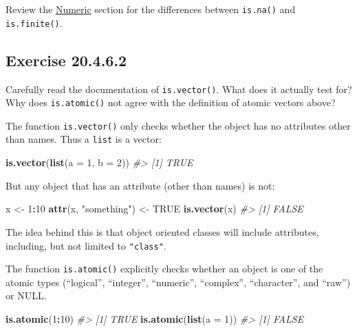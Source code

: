 \documentclass[]{book}
\newenvironment{Shaded}{\begin{snugshade}}{\end{snugshade}}
\newcommand{\CommentTok}[1]{\textcolor[rgb]{0.56,0.35,0.01}{\textit{#1}}}
\newcommand{\DataTypeTok}[1]{\textcolor[rgb]{0.13,0.29,0.53}{#1}}
\newcommand{\DecValTok}[1]{\textcolor[rgb]{0.00,0.00,0.81}{#1}}
\newcommand{\KeywordTok}[1]{\textcolor[rgb]{0.13,0.29,0.53}{\textbf{#1}}}
\newcommand{\NormalTok}[1]{#1}
\newcommand{\OperatorTok}[1]{\textcolor[rgb]{0.81,0.36,0.00}{\textbf{#1}}}
\newcommand{\OtherTok}[1]{\textcolor[rgb]{0.56,0.35,0.01}{#1}}
\newcommand{\StringTok}[1]{\textcolor[rgb]{0.31,0.60,0.02}{#1}}
\theoremstyle{plain}
\theoremstyle{remark}
\begin{document}
Review the \href{http://r4ds.had.co.nz/vectors.html\#numeric}{Numeric}
section for the differences between \texttt{is.na()} and
\texttt{is.finite()}.

\hypertarget{exercise-20.4.6.2}{%
\subsection*{\texorpdfstring{Exercise
{20.4.6.2}}{Exercise 20.4.6.2}}\label{exercise-20.4.6.2}}

Carefully read the documentation of \texttt{is.vector()}. What does it
actually test for? Why does \texttt{is.atomic()} not agree with the
definition of atomic vectors above?

The function \texttt{is.vector()} only checks whether the object has no
attributes other than names. Thus a \texttt{list} is a vector:

\begin{Shaded}
\begin{Highlighting}[]
\KeywordTok{is.vector}\NormalTok{(}\KeywordTok{list}\NormalTok{(}\DataTypeTok{a =} \DecValTok{1}\NormalTok{, }\DataTypeTok{b =} \DecValTok{2}\NormalTok{))}
\CommentTok{#> [1] TRUE}
\end{Highlighting}
\end{Shaded}

But any object that has an attribute (other than names) is not:

\begin{Shaded}
\begin{Highlighting}[]
\NormalTok{x <-}\StringTok{ }\DecValTok{1}\OperatorTok{:}\DecValTok{10}
\KeywordTok{attr}\NormalTok{(x, }\StringTok{"something"}\NormalTok{) <-}\StringTok{ }\OtherTok{TRUE}
\KeywordTok{is.vector}\NormalTok{(x)}
\CommentTok{#> [1] FALSE}
\end{Highlighting}
\end{Shaded}

The idea behind this is that object oriented classes will include
attributes, including, but not limited to \texttt{"class"}.

The function \texttt{is.atomic()} explicitly checks whether an object is
one of the atomic types (``logical'', ``integer'', ``numeric'',
``complex'', ``character'', and ``raw'') or NULL.

\begin{Shaded}
\begin{Highlighting}[]
\KeywordTok{is.atomic}\NormalTok{(}\DecValTok{1}\OperatorTok{:}\DecValTok{10}\NormalTok{)}
\CommentTok{#> [1] TRUE}
\KeywordTok{is.atomic}\NormalTok{(}\KeywordTok{list}\NormalTok{(}\DataTypeTok{a =} \DecValTok{1}\NormalTok{))}
\CommentTok{#> [1] FALSE}
\end{Highlighting}
\end{Shaded}
\end{document}
